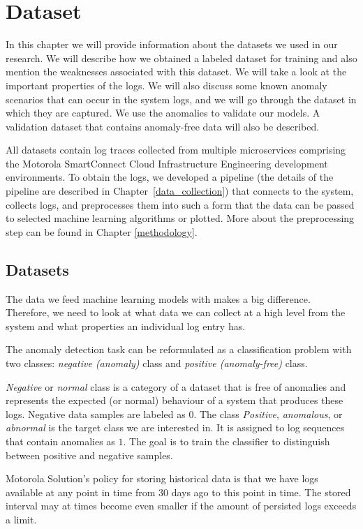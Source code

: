 \chapter{Dataset}
\label{chapter:dataset}

In this chapter we will provide information about the datasets we used in our research. We will describe how we obtained a labeled dataset for training and also mention the weaknesses associated with this dataset. We will take a look at the important properties of the logs. 
We will also discuss some known anomaly scenarios that can occur in the system logs, and we will go through the dataset in which they are captured. 
We use the anomalies to validate our models. A validation dataset that contains anomaly-free data will also be described. 

All datasets contain log traces collected from multiple microservices comprising the Motorola SmartConnect Cloud Infrastructure Engineering development environments.
To obtain the logs, we developed a pipeline (the details of the pipeline are described in Chapter~\ref{data_collection}) that connects to the system, collects logs, and preprocesses them into such a form that the data can be passed to selected machine learning algorithms or plotted.
More about the preprocessing step can be found in Chapter \ref{methodology}.

\section{Datasets}
\label{dataset}
The data we feed machine learning models with makes a big difference. Therefore, we need to look at what data we can collect at a high level from the system and what properties an individual log entry has.

The anomaly detection task can be reformulated as a classification problem with two classes: \textit{negative (anomaly)} class and \textit{positive (anomaly-free)} class. 

\textit{Negative} or \textit{normal} class is a category of a dataset that is free of anomalies and represents the expected (or normal) behaviour of a system that produces these logs. Negative data samples are labeled as $0$. The class \textit{Positive}, \textit{anomalous}, or \textit{abnormal} is the target class we are interested in. It is assigned to log sequences that contain anomalies as $1$. The goal is to train the classifier to distinguish between positive and negative samples.

Motorola Solution's policy for storing historical data is that we have logs available at any point in time from $30$ days ago to this point in time. The stored interval may at times become even smaller if the amount of persisted logs exceeds a limit.

